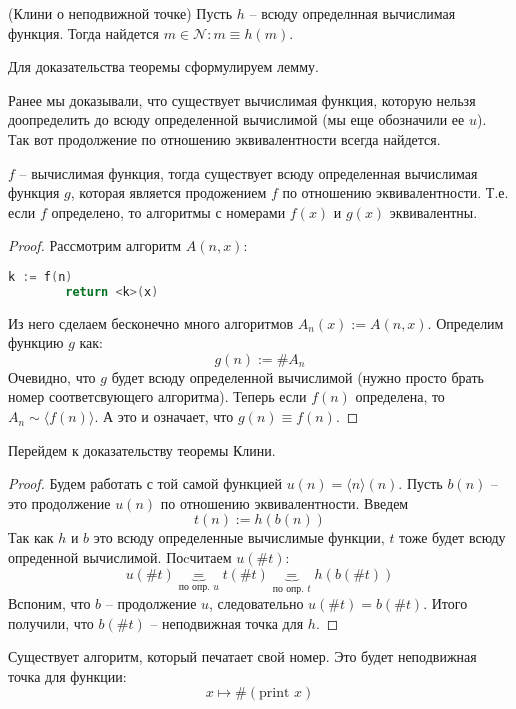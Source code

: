 \begin{theorem} (Клини о неподвижной точке)
    Пусть $h$ -- всюду определнная вычислимая функция. Тогда найдется $m \in \mathcal{N} : m \equiv h(m)$.
\end{theorem}

Для доказательства теоремы сформулируем лемму. 

Ранее мы доказывали, что существует вычислимая функция, которую нельзя доопределить до всюду определенной вычислимой (мы еще обозначили ее $u$). Так вот продолжение по отношению эквивалентности всегда найдется. 

\begin{lemma}
    $f$ -- вычислимая функция, тогда существует всюду определенная вычислимая функция $g$, которая является продожением $f$ по отношению эквивалентности. Т.е. если $f$ определено, то алгоритмы с номерами $f(x)$ и $g(x)$ эквивалентны.
\end{lemma}

\begin{proof}
    Рассмотрим алгоритм $A(n, x)$:  \begin{lstlisting}[language=c++]
        k := f(n)
        return <k>(x)
    \end{lstlisting}
    Из него сделаем бесконечно много алгоритмов $A_n(x) := A(n, x)$. 
    Определим функцию $g$ как: \[ g(n) := \#A_n \]
    Очевидно, что $g$ будет всюду определенной вычислимой (нужно  просто брать номер соответсвующего алгоритма). Теперь если $f(n)$ определена, то $A_n \sim \langle f(n) \rangle$. А это и означает, что $g(n) \equiv f(n)$.
\end{proof}

Перейдем к доказательству теоремы Клини.

\begin{proof}
    Будем работать с той самой функцией $u(n) = \langle n \rangle (n)$. Пусть $b(n)$ -- это продолжение $u(n)$ по отношению эквивалентности. Введем \[ t(n) := h(b(n)) \]
    Так как $h$ и $b$ это всюду определенные вычислимые функции, $t$ тоже будет всюду опреденной вычислимой. Поcчитаем $u(\#t)$: \[ u(\#t) \underbrace{=}_{\text{по опр. } u} t(\# t) \underbrace{=}_{\text{по опр. } t} h(b(\#t)) \]
    Вспоним, что $b$ -- продолжение $u$, следовательно $u(\#t) = b(\# t)$. Итого получили, что $b(\#t)$ -- неподвижная точка для $h$. 
\end{proof}

\begin{example}
    Существует алгоритм, который печатает свой номер. Это будет неподвижная точка для функции: \[ x \mapsto \#(\text{print } x) \]
\end{example}

